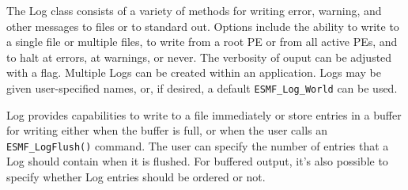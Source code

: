 %


The Log class consists of a variety of methods for writing error, warning, 
and other messages to files or to standard out.  Options include the ability 
to write to a single file or multiple files, to write from a root PE or 
from all active PEs, and to halt at errors, at warnings, or never.  The 
verbosity of ouput can be adjusted with a flag.  Multiple 
Logs can be created within an application.  Logs may be given
user-specified names, or, if desired, a default {\tt ESMF\_Log\_World} can 
be used.  

Log provides capabilities to write to a file immediately or store entries 
in a buffer for writing either when the buffer is full, or when the user
calls an {\tt ESMF\_LogFlush()} command.  The user can specify the number 
of entries that a Log should contain when it is flushed.  For buffered output, 
it's also possible to specify whether Log entries should be ordered or not.  

